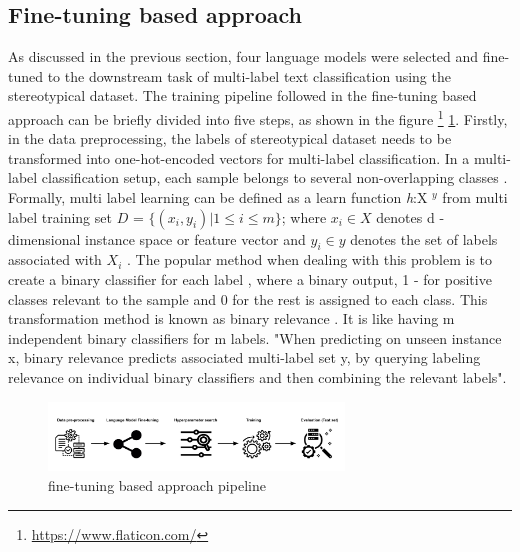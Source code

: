 \subsection{Fine-tuning based approach}
As discussed in the previous section, four language models were selected and fine-tuned to the downstream task of multi-label text classification using the stereotypical dataset. The training pipeline followed in the fine-tuning based approach can be briefly divided into five steps, as shown in the figure \footnote{\url{https://www.flaticon.com/}} \ref{fig:fine-tuning based approach}. Firstly, in the data preprocessing, the labels of stereotypical dataset needs to be transformed into one-hot-encoded vectors for multi-label classification. In a multi-label classification setup, each sample belongs to several non-overlapping classes \cite{sokolova2009systematic}. Formally, multi label learning can be defined as a learn function \textit{h}:X $^y$ from multi label training set $D$ = $\{(x_i,y_i)| 1 \leq i\leq m\}$; where  $x_i \in X$ denotes d - dimensional instance space or feature vector and $y_i \in y$ denotes the  set of labels associated with $X_i$ \cite{zhang2013review}. The popular method when dealing with this problem is to create a binary classifier for each label \cite{ji2008extracting}, where a binary output, 1 - for positive classes relevant to the sample and 0 for the rest is assigned to each class. This transformation method is known as binary relevance \cite{zhang2010multi}. 
It is like having m independent binary classifiers for m labels. "When predicting on unseen instance x, binary relevance predicts associated multi-label set y, by querying labeling relevance on individual binary classifiers and then combining the relevant labels"\cite{zhang2010multi}.  

\begin{figure}[]
    \centering
    \includegraphics[width=0.7\textwidth]{thesis/figures/LM pipeline.png}
    \caption{fine-tuning based approach pipeline}
    \label{fig:fine-tuning based approach}
\end{figure}

